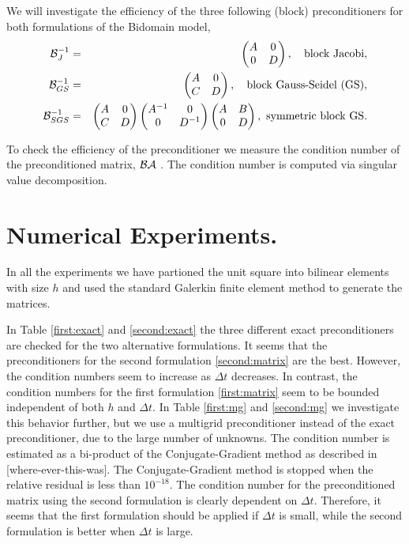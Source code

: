\documentclass{report}
\begin{document}
We will investigate the efficiency of the three following (block) preconditioners for
both formulations of the Bidomain model,
\begin{eqnarray*}
\mathcal{B}_J^{-1} &=&
\begin{pmatrix}
A & 0\\
0 & D
\end{pmatrix}, \quad \mbox{block Jacobi}, \\
\mathcal{B}_{GS}^{-1} &=&
\begin{pmatrix}
A & 0\\
C & D
\end{pmatrix}, \quad \mbox{block Gauss-Seidel (GS)}, \\
\mathcal{B}_{SGS}^{-1} &=&
\begin{pmatrix}
A & 0\\
C & D
\end{pmatrix}
\begin{pmatrix}
A^{-1} & 0\\
0 & D^{-1}
\end{pmatrix}
\begin{pmatrix}
A & B\\
0 & D
\end{pmatrix}, \ \mbox{symmetric block GS}.
\end{eqnarray*}

To check the efficiency of the preconditioner we measure the condition
number of the preconditioned matrix, $\mathcal{B} \mathcal{A}$ .
The condition number is computed via singular value decomposition.


\section{Numerical Experiments.}
In all the experiments we have partioned the unit square into
bilinear elements with size $h$ and used the standard
Galerkin finite element method to generate the matrices.

In Table \ref{first:exact} and \ref{second:exact} the three different
exact preconditioners are checked for the two alternative formulations.
It seems that the preconditioners for the second formulation \eqref{second:matrix}
are the best.
However, the condition numbers seem to increase as $\Delta t$ decreases. In contrast,
the condition numbers for the first formulation \eqref{first:matrix} seem
to be bounded independent of both $h$ and $\Delta t$.
In Table \ref{first:mg} and \ref{second:mg} we investigate this behavior further,
but we use a multigrid preconditioner instead of the exact preconditioner,
due to the large number of
unknowns. The condition number is estimated as a bi-product of the
Conjugate-Gradient method as described in [where-ever-this-was].
The Conjugate-Gradient method is stopped when the relative residual
is less than $10^{-18}$.
The condition number for the preconditioned matrix using the second formulation
is clearly dependent on $\Delta t$. Therefore, it seems that the first formulation
should be applied if $\Delta t$ is small, while the second formulation is
better when $\Delta t$
is large.
\end{document}
